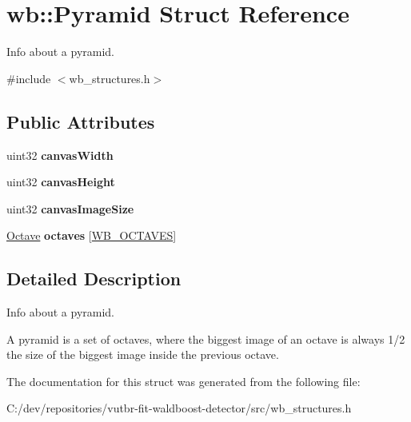 \hypertarget{structwb_1_1_pyramid}{}\section{wb\+:\+:Pyramid Struct Reference}
\label{structwb_1_1_pyramid}


Info about a pyramid.  




{\ttfamily \#include $<$wb\+\_\+structures.\+h$>$}

\subsection*{Public Attributes}
\begin{DoxyCompactItemize}
\item 
\hypertarget{structwb_1_1_pyramid_acc70ceeb48ac9b885ab5d51fbe2e8f3c}{}uint32 {\bfseries canvas\+Width}\label{structwb_1_1_pyramid_acc70ceeb48ac9b885ab5d51fbe2e8f3c}

\item 
\hypertarget{structwb_1_1_pyramid_a64263c90e68fcefbb196988b6d5837da}{}uint32 {\bfseries canvas\+Height}\label{structwb_1_1_pyramid_a64263c90e68fcefbb196988b6d5837da}

\item 
\hypertarget{structwb_1_1_pyramid_a8605f3931016cbc267639b59e8702943}{}uint32 {\bfseries canvas\+Image\+Size}\label{structwb_1_1_pyramid_a8605f3931016cbc267639b59e8702943}

\item 
\hypertarget{structwb_1_1_pyramid_ac36b3371df970a20fc6a403fc03fc4c9}{}\hyperlink{structwb_1_1_octave}{Octave} {\bfseries octaves} \mbox{[}\hyperlink{wb__general_8h_a3ee0080df2ddeddbb7502ae4e47c5101}{W\+B\+\_\+\+O\+C\+T\+A\+V\+E\+S}\mbox{]}\label{structwb_1_1_pyramid_ac36b3371df970a20fc6a403fc03fc4c9}

\end{DoxyCompactItemize}


\subsection{Detailed Description}
Info about a pyramid. 

A pyramid is a set of octaves, where the biggest image of an octave is always 1/2 the size of the biggest image inside the previous octave. 

The documentation for this struct was generated from the following file\+:\begin{DoxyCompactItemize}
\item 
C\+:/dev/repositories/vutbr-\/fit-\/waldboost-\/detector/src/wb\+\_\+structures.\+h\end{DoxyCompactItemize}
